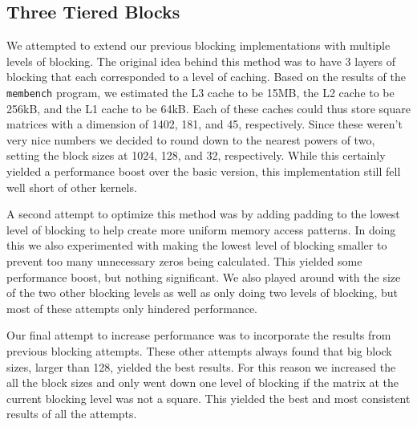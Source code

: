 \newcommand{\ttt}[1]{\texttt{#1}}

\subsection{Three Tiered Blocks}
We attempted to extend our previous blocking implementations with multiple
levels of blocking. The original idea behind this method was to have 3 layers 
of blocking that each corresponded to a level of caching. Based on the results 
of the \ttt{membench} program, we estimated the L3 cache to be 15MB, the L2 cache to 
be 256kB, and the L1 cache to be 64kB. Each of these caches could thus store 
square matrices with a dimension of 1402, 181, and 45, respectively. Since 
these weren't very nice numbers we decided to round down to the nearest powers of two,
setting the block sizes at 1024, 128, and 32, respectively. While this 
certainly yielded a performance boost over the basic version, this 
implementation still fell well short of other kernels.

A second attempt to optimize this method was by adding padding to the lowest 
level of blocking to help create more uniform memory access patterns. In doing 
this we also experimented with making the lowest level of blocking smaller to 
prevent too many unnecessary zeros being calculated. This yielded some 
performance boost, but nothing significant. We also played around with the 
size of the two other blocking levels as well as only doing two levels of 
blocking, but most of these attempts only hindered performance.

Our final attempt to increase performance was to incorporate the results from 
previous blocking attempts. These other attempts always found that big block 
sizes, larger than 128, yielded the best results. For this reason we increased 
the all the block sizes and only went down one level of blocking if the matrix 
at the current blocking level was not a square. This yielded the best and most 
consistent results of all the attempts.